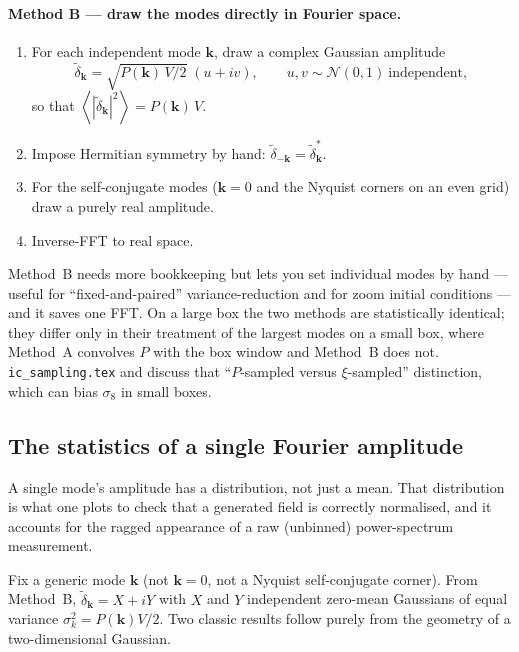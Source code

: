 \documentclass[12pt]{article}
\newcommand{\bk}{\mathbf{k}}
\newcommand{\avg}[1]{\left\langle #1 \right\rangle}
\newcommand{\code}[1]{\texttt{#1}}
\begin{document}
\paragraph{Method B --- draw the modes directly in Fourier space.}
\begin{enumerate}
  \item For each independent mode $\bk$, draw a complex Gaussian
        amplitude
        \begin{equation*}
          \tilde\delta_\bk = \sqrt{P(\bk)\,V/2}\;(u + iv),
          \qquad u, v \sim \mathcal N(0,1)\ \text{independent},
        \end{equation*}
        so that $\avg{|\tilde\delta_\bk|^2} = P(\bk)\,V$.
  \item Impose Hermitian symmetry by hand:
        $\tilde\delta_{-\bk} = \tilde\delta_\bk^*$.
  \item For the self-conjugate modes ($\bk = 0$ and the Nyquist corners
        on an even grid) draw a purely real amplitude.
  \item Inverse-FFT to real space.
\end{enumerate}
Method~B needs more bookkeeping but lets you set individual modes by hand
--- useful for ``fixed-and-paired'' variance-reduction
\citep{AnguloPontzen2016} and for zoom initial conditions --- and it
saves one FFT.  On a large box the two methods are statistically
identical; they differ only in their treatment of the largest modes on a
small box, where Method~A convolves $P$ with the box window and Method~B
does not.  \code{ic\_sampling.tex} and \citet{Pen1997, Sirko2005} discuss
that ``$P$-sampled versus $\xi$-sampled'' distinction, which can bias
$\sigma_8$ in small boxes.

\subsection{The statistics of a single Fourier amplitude}
\label{sec:mode-stats}

A single mode's amplitude has a distribution, not just a mean.  That
distribution is what one plots to check that a generated field is
correctly normalised, and it accounts for the ragged appearance of a
raw (unbinned) power-spectrum measurement.

Fix a generic mode $\bk$ (not $\bk=0$, not a Nyquist self-conjugate
corner).  From Method~B, $\tilde\delta_\bk = X + iY$ with $X$ and $Y$
independent zero-mean Gaussians of equal variance $\sigma_k^2 =
P(\bk)V/2$.  Two classic results follow purely from the geometry of a
two-dimensional Gaussian.
\end{document}
